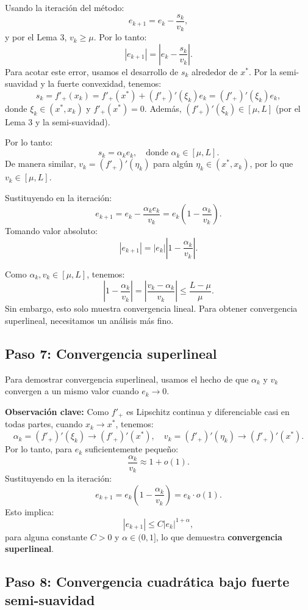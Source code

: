 \documentclass[12pt]{book}
\theoremstyle{definition}
\theoremstyle{plain}
\theoremstyle{remark}
\begin{document}
Usando la iteración del método:
\[
e_{k+1} = e_k - \frac{s_k}{v_k},
\]
y por el Lema 3, \( v_k \geq \mu \). Por lo tanto:
\[
|e_{k+1}| = \left| e_k - \frac{s_k}{v_k} \right|.
\]
%
Para acotar este error, usamos el desarrollo de \( s_k \) alrededor de \( x^* \). Por la semi-suavidad y la fuerte convexidad, tenemos:
\[
s_k = f'_+(x_k) = f'_+(x^*) + (f'_+)'(\xi_k) e_k = (f'_+)'(\xi_k) e_k,
\]
donde \( \xi_k \in (x^*, x_k) \) y \( f'_+(x^*) = 0 \). Además, \( (f'_+)'(\xi_k) \in [\mu, L] \) (por el Lema 3 y la semi-suavidad).

\medskip
Por lo tanto:
\[
s_k = \alpha_k e_k, \quad \text{donde } \alpha_k \in [\mu, L].
\]
De manera similar, \( v_k = (f'_+)'(\eta_k) \) para algún \( \eta_k \in (x^*, x_k) \), por lo que \( v_k \in [\mu, L] \).

\medskip
Sustituyendo en la iteración:
\[
e_{k+1} = e_k - \frac{\alpha_k e_k}{v_k} = e_k \left(1 - \frac{\alpha_k}{v_k}\right).
\]
Tomando valor absoluto:
\[
|e_{k+1}| = |e_k| \left|1 - \frac{\alpha_k}{v_k}\right|.
\]

\medskip
Como \( \alpha_k, v_k \in [\mu, L] \), tenemos:
\[
\left|1 - \frac{\alpha_k}{v_k}\right| = \left| \frac{v_k - \alpha_k}{v_k} \right| \leq \frac{L - \mu}{\mu}.
\]
Sin embargo, esto solo muestra convergencia lineal. Para obtener convergencia superlineal, necesitamos un análisis más fino.

\subsection*{Paso 7: Convergencia superlineal}

Para demostrar convergencia superlineal, usamos el hecho de que \( \alpha_k \) y \( v_k \) convergen a un mismo valor cuando \( e_k \to 0 \).

\medskip
\textbf{Observación clave:}
Como \( f'_+ \) es Lipschitz continua y diferenciable casi en todas partes, cuando \( x_k \to x^* \), tenemos:
\[
\alpha_k = (f'_+)'(\xi_k) \to (f'_+)' (x^*), \quad v_k = (f'_+)'(\eta_k) \to (f'_+)' (x^*).
\]
Por lo tanto, para \( e_k \) suficientemente pequeño:
\[
\frac{\alpha_k}{v_k} \approx 1 + o(1).
\]
Sustituyendo en la iteración:
\[
e_{k+1} = e_k \left(1 - \frac{\alpha_k}{v_k}\right) = e_k \cdot o(1).
\]
Esto implica:
\[
|e_{k+1}| \leq C |e_k|^{1 + \alpha},
\]
para alguna constante \( C > 0 \) y \( \alpha \in (0,1] \), lo que demuestra \textbf{convergencia superlineal}.

\subsection*{Paso 8: Convergencia cuadrática bajo fuerte semi-suavidad}
\end{document}
